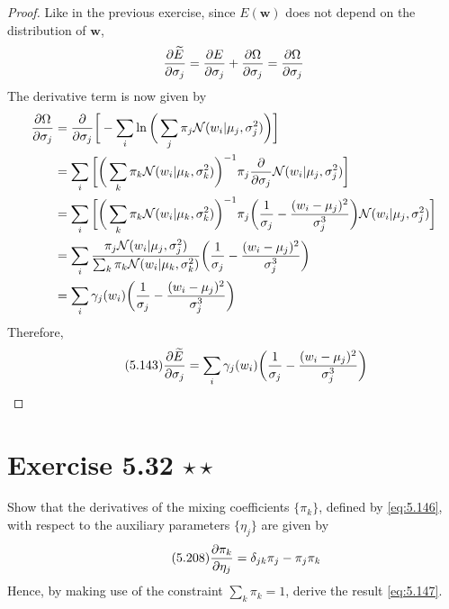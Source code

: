 \begin{proof}
\vspace{1em}
    Like in the previous exercise, since $E(\mathbf{w})$ does not depend on the distribution of $\mathbf{w}$,
    \[
            \pdv{\widetilde{E}}{\sigma_j} 
            = \pdv{E}{\sigma_j} + \pdv{\Omega}{\sigma_j}
            = \pdv{\Omega}{\sigma_j}
    \] 
    The derivative term is now given by
    \begin{align*}
        \pdv{\Omega}{\sigma_j} 
        &= \pdv{\sigma_j} \bigg[-\sum_{i}^{} \ln\bigg(\sum_{j}^{} \pi_j \mathcal{N}(w_i | \mu_j, \sigma_j^2)\bigg)\bigg] \\
        &= \sum_{i}^{} \bigg[\bigg(\sum_{k}^{} \pi_k \mathcal{N}(w_i | \mu_k, \sigma_k^2)\bigg)^{-1}
        \pi_j \pdv{\sigma_j} \mathcal{N}(w_i | \mu_j, \sigma_j^2)\bigg] \\
        &= \sum_{i}^{} \bigg[\bigg(\sum_{k}^{} \pi_k \mathcal{N}(w_i | \mu_k, \sigma_k^2)\bigg)^{-1}
            \pi_j \bigg(\frac{1}{\sigma_j} - \frac{(w_i - \mu_j)^2}{\sigma_j^3}\bigg) 
        \mathcal{N}(w_i | \mu_j, \sigma_j^2)\bigg] \\
        &= \sum_{i}^{} \frac{\pi_j \mathcal{N}(w_i | \mu_j, \sigma_j^2)} 
            {\sum_{k}^{} \pi_k \mathcal{N}(w_i | \mu_k, \sigma_k^2)}
            \bigg(\frac{1}{\sigma_j} - \frac{(w_i - \mu_j)^2}{\sigma_j^3}\bigg) \\
        &= \sum_{i}^{} \gamma_j(w_i)
            \bigg(\frac{1}{\sigma_j} - \frac{(w_i - \mu_j)^2}{\sigma_j^3}\bigg) 
    \end{align*}
    Therefore,
    \begin{equation}\label{eq:5.143}\tag{5.143}
        \pdv{\widetilde{E}}{\sigma_j}
        = \sum_{i}^{} \gamma_j(w_i)
            \bigg(\frac{1}{\sigma_j} - \frac{(w_i - \mu_j)^2}{\sigma_j^3}\bigg) 
    \end{equation}
\end{proof}

\section*{Exercise 5.32 $\star \star$}
Show that the derivatives of the mixing coefficients $\{\pi_k\}$, defined
by \eqref{eq:5.146}, with respect to the auxiliary parameters $\{\eta_j\}$ are 
given by  
\begin{equation}\label{eq:5.208}\tag{5.208}
    \pdv{\pi_k}{\eta_j} = \delta_{jk} \pi_j - \pi_j \pi_k
\end{equation}
Hence, by making use of the constraint $\sum_{k}^{} \pi_k = 1$, derive
the result \eqref{eq:5.147}.

